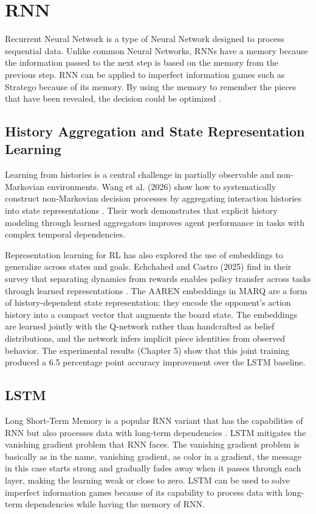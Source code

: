 \section{RNN}
Recurrent Neural Network is a type of Neural Network designed to process sequential data. Unlike common Neural Networks, RNNs have a memory because the information passed to the next step is based on the memory from the previous step. RNN can be applied to imperfect information games such as Stratego because of its memory. By using the memory to remember the pieces that have been revealed, the decision could be optimized \cite{AIAgent}.

\subsection{History Aggregation and State Representation Learning}
Learning from histories is a central challenge in partially observable and non-Markovian environments. Wang et al. (2026) show how to systematically construct non-Markovian decision processes by aggregating interaction histories into state representations \cite{wang2026history}. Their work demonstrates that explicit history modeling through learned aggregators improves agent performance in tasks with complex temporal dependencies.

Representation learning for RL has also explored the use of embeddings to generalize across states and goals. Echchahed and Castro (2025) find in their survey that separating dynamics from rewards enables policy transfer across tasks through learned representations \cite{echchahed2025srl}. The AAREN embeddings in MARQ are a form of history-dependent state representation: they encode the opponent's action history into a compact vector that augments the board state. The embeddings are learned jointly with the Q-network rather than handcrafted as belief distributions, and the network infers implicit piece identities from observed behavior. The experimental results (Chapter 5) show that this joint training produced a 6.5 percentage point accuracy improvement over the LSTM baseline.
\subsection{LSTM}
Long Short-Term Memory is a popular RNN variant that has the capabilities of RNN but also processes data with long-term dependencies \cite{ALSELWI2024102068}. LSTM mitigates the vanishing gradient problem that RNN faces. The vanishing gradient problem is basically as in the name, vanishing gradient, as color in a gradient, the message in this case starts strong and gradually fades away when it passes through each layer, making the learning weak or close to zero. LSTM can be used to solve imperfect information games because of its capability to process data with long-term dependencies while having the memory of RNN.

